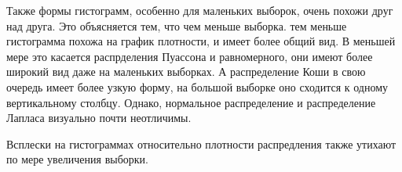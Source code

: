 \documentclass[12pt,a4paper]{article}
\begin{document}
Также формы гистограмм, особенно для маленьких выборок, очень похожи друг над друга. Это объясняется тем, что чем меньше выборка. тем меньше гистограмма похожа на график плотности, и имеет более общий вид. В меньшей мере это касается распрделения Пуассона и равномерного, они имеют более широкий вид даже на маленьких выборках. А распределение Коши в свою очередь имеет более узкую форму, на большой выборке оно сходится к одному вертикальному столбцу. Однако, нормальное распределение и распределение Лапласа визуально почти неотличимы.

Всплески на гистограммах относительно плотности распредления также утихают по мере увеличения выборки. 
\end{document}
